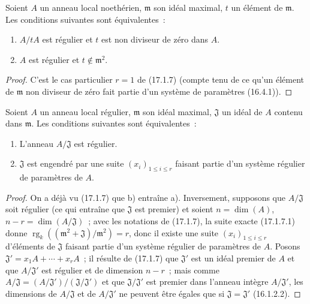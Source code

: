\begin{corollary}[17.1.8]
\label{0.17.1.8-fr}
Soient $A$ un anneau local noethérien, $\mathfrak{m}$ son idéal maximal, $t$ un
élément de $\mathfrak{m}$. Les conditions suivantes sont équivalentes~:
\begin{enumerate}
  \item[\rm a)] $A/tA$ est régulier et $t$ est non diviseur de zéro dans $A$.
  \item[\rm b)] $A$ est régulier et $t\notin\mathfrak{m}^2$.
\end{enumerate}
\end{corollary}

\begin{proof}
C'est le cas particulier $r=1$ de (17.1.7) (compte tenu de ce qu'un élément de
$\mathfrak{m}$ non diviseur de zéro fait partie d'un système de paramètres
(16.4.1)).
\end{proof}

\begin{corollary}[17.1.9]
\label{0.17.1.9-fr}
Soient $A$ un anneau local régulier, $\mathfrak{m}$ son idéal maximal,
$\mathfrak{J}$ un idéal de $A$ contenu dans $\mathfrak{m}$. Les conditions
suivantes sont équivalentes~:
\begin{enumerate}
  \item[\rm a)] L'anneau $A/\mathfrak{J}$ est régulier.
  \item[\rm b)] $\mathfrak{J}$ est engendré par une suite
  $(x_i)_{1\leq i\leq r}$ faisant partie d'un système régulier de paramètres
  de $A$.
\end{enumerate}
\end{corollary}

\begin{proof}
On a déjà vu (17.1.7) que b) entraîne a). Inversement, supposons que
$A/\mathfrak{J}$ soit régulier (ce qui entraîne que $\mathfrak{J}$ est premier)
et soient $n=\dim(A)$, $n-r=\dim(A/\mathfrak{J})$~; avec les notations de
(17.1.7), la suite exacte (17.1.7.1) donne
$\operatorname{rg}_k((\mathfrak{m}^2+\mathfrak{J})/\mathfrak{m}^2)=r$, donc il
existe une suite $(x_i)_{1\leq i\leq r}$ d'éléments de $\mathfrak{J}$ faisant
partie d'un système régulier de paramètres de $A$. Posons
$\mathfrak{J}'=x_1A+\cdots+x_rA$~; il résulte de (17.1.7) que $\mathfrak{J}'$
est un idéal premier de $A$ et que $A/\mathfrak{J}'$ est régulier et de
dimension $n-r$~; mais comme
$A/\mathfrak{J}=(A/\mathfrak{J}')/(\mathfrak{J}/\mathfrak{J}')$ et que
$\mathfrak{J}/\mathfrak{J}'$ est premier dans l'anneau intègre
$A/\mathfrak{J}'$, les dimensions de $A/\mathfrak{J}$ et de
$A/\mathfrak{J}'$ ne peuvent être égales que si
$\mathfrak{J}=\mathfrak{J}'$ (16.1.2.2).
\end{proof}

